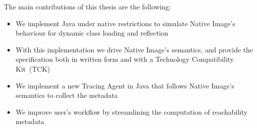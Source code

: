The main contributions of this thesis are the following:
\begin{itemize}
  \item We implement Java under native restrictions to simulate Native Image's behaviour for dynamic class loading and reflection
  \item With this implementation we drive Native Image's semantics, and provide the specification both in written form and with a Technology Compatibility Kit~(TCK) 
  \item We implement a new Tracing Agent in Java that follows Native Image's semantics to collect the metadata 
  \item We improve user's workflow by streamlining the computation of reachability metadata
\end{itemize}